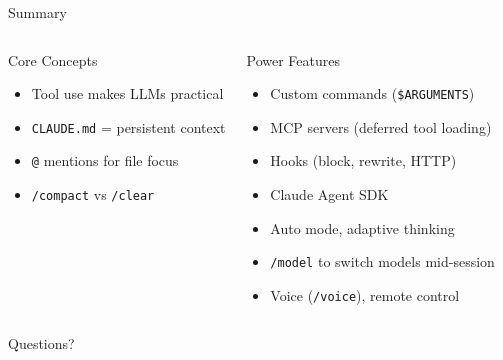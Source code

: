 \documentclass[aspectratio=169]{beamer}
\begin{document}
\begin{frame}{Summary}
\begin{columns}[T]
\begin{block}{Core Concepts}
\begin{itemize}
  \item Tool use makes LLMs practical
  \item \texttt{CLAUDE.md} = persistent context
  \item \texttt{@} mentions for file focus
  \item \texttt{/compact} vs \texttt{/clear}
\end{itemize}
\end{block}

\begin{block}{Power Features}
\begin{itemize}
  \item Custom commands (\texttt{\$ARGUMENTS})
  \item MCP servers (deferred tool loading)
  \item Hooks (block, rewrite, HTTP)
  \item Claude Agent SDK
  \item Auto mode, adaptive thinking
  \item \texttt{/model} to switch models mid-session
  \item Voice (\texttt{/voice}), remote control
\end{itemize}
\end{block}
\end{columns}

\vfill
\centering
\Large\color{popblue} Questions?
\end{frame}
\end{document}
